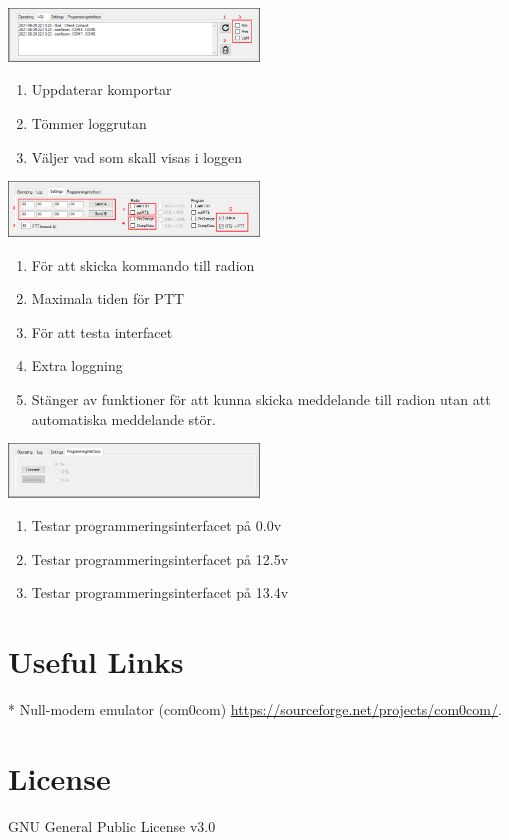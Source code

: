 \documentclass[a4paper]{article}
\begin{document}
\includegraphics[width=0.5\textwidth]{../image/AuroraRemoteLog.png}
\begin{enumerate}   
\item Uppdaterar komportar
\item Tömmer loggrutan
\item Väljer vad som skall visas i loggen
\end{enumerate}  

\includegraphics[width=0.5\textwidth]{../image/AuroraRemoteSettings.png}
\begin{enumerate}   
\item För att skicka kommando till radion
\item Maximala tiden för PTT
\item För att testa interfacet
\item Extra loggning
\item Stänger av funktioner för att kunna skicka meddelande till radion utan att automatiska meddelande stör. 
\end{enumerate}  

\includegraphics[width=0.5\textwidth]{../image/AuroraRemoteProg.png}
\begin{enumerate}   
\item Testar programmeringsinterfacet på   0.0v
\item Testar programmeringsinterfacet på 12.5v
\item Testar programmeringsinterfacet på 13.4v
\end{enumerate}  

\newpage


\section*{Useful Links}

* Null-modem emulator (com0com) \href{https://sourceforge.net/projects/com0com/}{https://sourceforge.net/projects/com0com/}. 

\section*{License}

GNU General Public License v3.0
\end{document}
